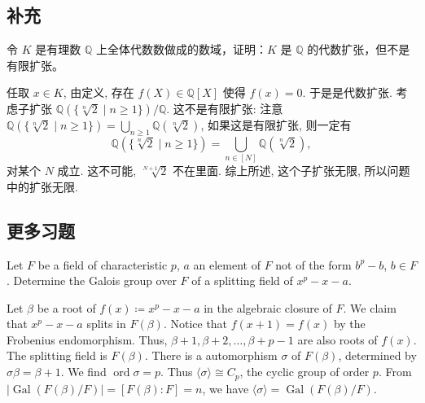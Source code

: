 
\subsection{补充}
\setcounter{pb}{1}
\begin{problem}
令 $K$ 是有理数 $\mathbb{Q}$ 上全体代数数做成的数域，证明：$K$ 是 $\mathbb{Q}$ 的代数扩张，但不是有限扩张。
\end{problem}

\begin{solution}
    任取 $x\in K$, 由定义, 存在 $f(X)\in\mathbb{Q}[X]$ 使得 $f(x)=0$. 于是是代数扩张. 
    考虑子扩张 $\mathbb{Q}(\{\sqrt[n]{2}\mid n\geq1 \})/\mathbb{Q}$. 
    这不是有限扩张: 注意 $\mathbb{Q}(\{\sqrt[n]{2}\mid n\geq1 \})=\bigcup_{n\geq1}\mathbb{Q}(\sqrt[n]{2})$, 
    如果这是有限扩张, 则一定有 
        \[
            \mathbb{Q}(\{\sqrt[n]{2}\mid n\geq1 \})=\bigcup_{n\in[N]}\mathbb{Q}(\sqrt[n]{2}),
        \]
    对某个 $N$ 成立. 这不可能, $\sqrt[N+1]{2}$ 不在里面. 综上所述, 这个子扩张无限, 所以问题中的扩张无限. 
\end{solution}

\subsection{更多习题}
\setcounter{pb}{1}
\begin{problem}
Let $F$ be a field of characteristic $p$, $a$ an element of $F$ not of the form $b^p - b$, $b \in F$. Determine the Galois group over $F$ of a splitting field of $x^p - x - a$.
\end{problem}

\begin{solution}
    Let $\beta$ be a root of $f(x)\coloneqq  x^p-x-a$ in the algebraic closure of $F$. We claim that $x^p-x-a$ splits in $F(\beta)$. 
    Notice that $f(x+1)=f(x)$ by the Frobenius endomorphism. Thus, $\beta+1, \beta+2,\dots,\beta+p-1$ are also roots of $f(x)$. 
    The splitting field is $F(\beta)$. There is a automorphism $\sigma$ of $F(\beta)$, determined by $\sigma\beta=\beta+1$. 
    We find $\operatorname{ord}\sigma=p$. Thus $\langle \sigma \rangle\cong C_{p}$, the cyclic group of order $p$. 
    From $|\operatorname{Gal}(F(\beta)/F)|=[F(\beta):F]=n$, we have $\langle \sigma \rangle=\operatorname{Gal}(F(\beta)/F)$.
\end{solution}

